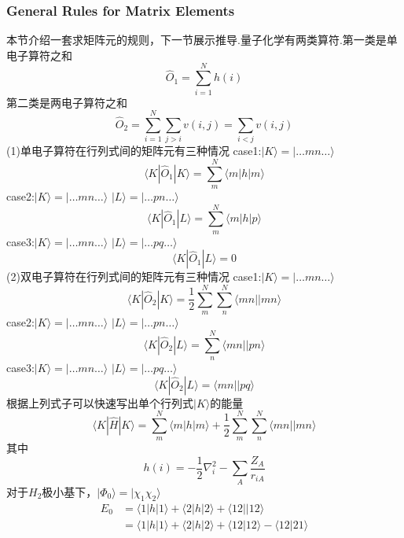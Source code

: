\documentclass[fontset=none,12pt,a4paper]{ctexart}
\numberwithin{equation}{section}
\begin{document}
\subsubsection{General Rules for Matrix Elements}
本节介绍一套求矩阵元的规则，下一节展示推导.量子化学有两类算符.第一类是单电子算符之和
\begin{equation}
  \hat{O}_1=\sum_{i=1}^{N}h\left(i\right)
\end{equation}
第二类是两电子算符之和
\begin{equation}
  \hat{O}_2=\sum_{i=1}^{N}\sum_{j>i}v\left(i,j\right)=\sum_{i<j}v\left(i,j\right)
\end{equation}
(1)单电子算符在行列式间的矩阵元有三种情况
case1:$|K\rangle=|\dots mn \dots\rangle$
\begin{equation}
  \langle K|\hat{O}_1|K\rangle=\sum_{m}^{N}\langle m|h|m \rangle
\end{equation}
case2:$|K\rangle=|\dots mn \dots\rangle$ 
$|L\rangle=|\dots pn \dots\rangle$ 
\begin{equation}
  \langle K|\hat{O}_1|L\rangle=\sum_{m}^{N}\langle m|h|p \rangle
\end{equation}
case3:$|K\rangle=|\dots mn \dots\rangle$
$|L\rangle=|\dots pq \dots\rangle$
\begin{equation}
  \langle K|\hat{O}_1|L\rangle=0
\end{equation}
(2)双电子算符在行列式间的矩阵元有三种情况
case1:$|K\rangle=|\dots mn \dots\rangle$
\begin{equation}
  \langle K|\hat{O}_2|K\rangle=\frac{1}{2}\sum_{m}^{N}\sum_{n}^{N}\langle mn||mn \rangle
\end{equation}
case2:$|K\rangle=|\dots mn \dots\rangle$ 
$|L\rangle=|\dots pn \dots\rangle$ 
\begin{equation}
  \langle K|\hat{O}_2|L\rangle=\sum_{n}^{N}\langle mn||pn \rangle
\end{equation}
case3:$|K\rangle=|\dots mn \dots\rangle$
$|L\rangle=|\dots pq \dots\rangle$
\begin{equation}
  \langle K|\hat{O}_2|L\rangle=\langle mn||pq \rangle
\end{equation}
根据上列式子可以快速写出单个行列式$|K\rangle$的能量
\begin{equation}
  \langle K|\hat{H}|K\rangle=
  \sum_{m}^{N}\langle m|h|m\rangle +\frac{1}{2}\sum_{m}^{N}\sum_{n}^{N}\langle mn||mn\rangle
  \label{eq:determinant-energy}
\end{equation}
其中
\begin{equation}
  h(i)=-\frac{1}{2}\nabla_i^2-\sum_{A}\frac{Z_A}{r_{iA}}
\end{equation}
对于$H_2$极小基下，$|\Phi_0\rangle=|\chi_1\chi_2\rangle$
\begin{equation}
  \begin{aligned}
  E_0&=\langle 1|h|1\rangle+\langle2|h|2\rangle+\langle12||12\rangle \\
     &=\langle 1|h|1\rangle+\langle2|h|2\rangle+\langle12|12\rangle-\langle12|21\rangle
  \end{aligned}
\end{equation}
\end{document}
